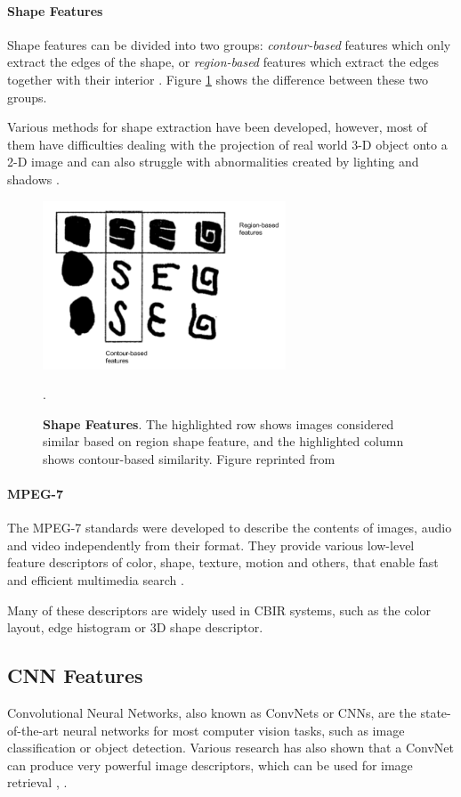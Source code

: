 \documentclass[12pt]{report}
\begin{document}
\paragraph{Shape Features}
Shape features can be divided into two groups: \textit{contour-based} features which only extract the edges of the shape, or \textit{region-based} features which extract the edges together with their interior \cite{zhang2004review}. Figure \ref{fig:shape_feat} shows the difference between these two groups.

Various methods for shape extraction have been developed, however, most of them have difficulties dealing with the projection of real world 3-D object onto a 2-D image and can also struggle with abnormalities created by lighting and shadows \cite{zhang2004review}.

\begin{figure}[h]
\centering
{\includegraphics[height=5cm]{02_background/CBIR/shape_features}}
\caption{\label{fig:shape_feat} \textbf{Shape Features}. The highlighted row shows images considered similar based on region shape feature, and the highlighted column shows contour-based similarity. Figure reprinted from \cite{bober_mpeg-7_2001}}.
\end{figure}

\paragraph{MPEG-7}
The MPEG-7 standards were developed to describe the contents of images, audio and video independently from their format. They provide various low-level feature descriptors of color, shape, texture, motion and others, that enable fast and efficient multimedia search \cite{noauthor_visual_nodate}.

Many of these descriptors are widely used in CBIR systems, such as the color layout, edge histogram or 3D shape descriptor.

\pagebreak
\subsection{CNN Features}
Convolutional Neural Networks, also known as ConvNets or CNNs, are the state-of-the-art neural networks for most computer vision tasks, such as image classification or object detection. Various research has also shown that a ConvNet can produce very powerful image descriptors, which can be used for image retrieval \cite{razavian_cnn_2014-2}, \cite{NIPS2012_4824}.
\end{document}
